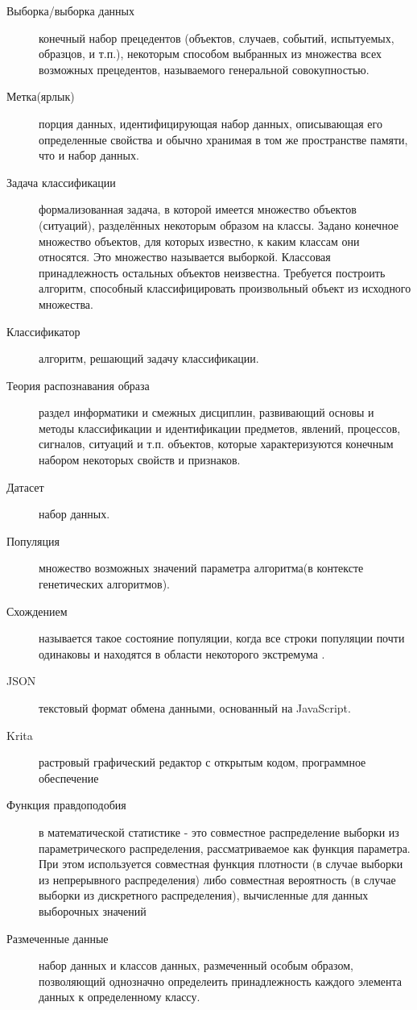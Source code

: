\Defines %
\begin{description}
	
	\item[Выборка/выборка данных]  конечный набор прецедентов (объектов, случаев, событий, испытуемых, образцов, и т.п.), некоторым способом выбранных из множества всех возможных прецедентов, называемого генеральной совокупностью\cite{def01}.
	\item[Метка(ярлык)]  порция данных, идентифицирующая набор данных, описывающая его определенные свойства и обычно хранимая в том же пространстве памяти, что и набор данных\cite{def02}.
	
	\item[Задача классификации]{ формализованная задача, в которой имеется множество объектов (ситуаций), разделённых некоторым образом на классы. Задано конечное множество объектов, для которых известно, к каким классам они относятся. Это множество называется выборкой. Классовая принадлежность остальных объектов неизвестна. Требуется построить алгоритм, способный классифицировать  произвольный объект из исходного множества\cite{def03}}.
	\item[Классификатор] {алгоритм, решающий задачу классификации.}
	
	\item[Теория распознавания образа] раздел информатики и смежных дисциплин, развивающий основы и методы классификации и идентификации предметов, явлений, процессов, сигналов, ситуаций и т.п. объектов, которые характеризуются конечным набором некоторых свойств и признаков.

	\item[Датасет]  набор данных\cite{def07}.
	\item[Популяция]  множество возможных значений параметра алгоритма(в контексте генетических алгоритмов)\cite{Book17}.
	\item[Схождением] называется такое состояние популяции, когда все строки популяции почти одинаковы и находятся в области некоторого экстремума \cite{def05}.
	\item[JSON] текстовый формат обмена данными, основанный на JavaScript\cite{def08}.
	\item[Krita]  растровый графический редактор с открытым кодом, программное обеспечение
	\item[Функция правдоподобия] в математической статистике - это совместное распределение выборки из параметрического распределения, рассматриваемое как функция параметра. При этом используется совместная функция плотности (в случае выборки из непрерывного распределения) либо совместная вероятность (в случае выборки из дискретного распределения), вычисленные для данных выборочных значений\cite{Book21}
	\item[Размеченные данные]  набор данных и классов данных, размеченный особым образом, позволяющий однозначно определеить принадлежность каждого элемента данных к определенному классу. 
	
\end{description}

